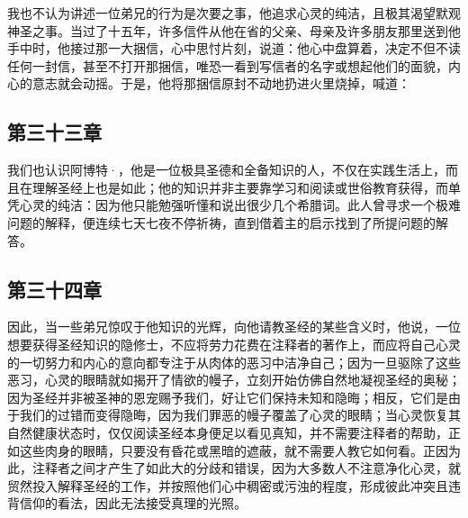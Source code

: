 \par

我也不认为讲述一位弟兄的行为是次要之事，他追求心灵的纯洁，且极其渴望默观神圣之事。当过了十五年，许多信件从他在省的父亲、母亲及许多朋友那里送到他手中时，他接过那一大捆信，心中思忖片刻，说道：他心中盘算着，决定不但不读任何一封信，甚至不打开那捆信，唯恐一看到写信者的名字或想起他们的面貌，内心的意志就会动摇。于是，他将那捆信原封不动地扔进火里烧掉，喊道：\par


\subsection{第三十三章}

\par

我们也认识阿博特·，他是一位极具圣德和全备知识的人，不仅在实践生活上，而且在理解圣经上也是如此；他的知识并非主要靠学习和阅读或世俗教育获得，而单凭心灵的纯洁：因为他只能勉强听懂和说出很少几个希腊词。此人曾寻求一个极难问题的解释，便连续七天七夜不停祈祷，直到借着主的启示找到了所提问题的解答。\par


\subsection{第三十四章}

\par

因此，当一些弟兄惊叹于他知识的光辉，向他请教圣经的某些含义时，他说，一位想要获得圣经知识的隐修士，不应将劳力花费在注释者的著作上，而应将自己心灵的一切努力和内心的意向都专注于从肉体的恶习中洁净自己；因为一旦驱除了这些恶习，心灵的眼睛就如揭开了情欲的幔子，立刻开始仿佛自然地凝视圣经的奥秘；因为圣经并非被圣神的恩宠赐予我们，好让它们保持未知和隐晦；相反，它们是由于我们的过错而变得隐晦，因为我们罪恶的幔子覆盖了心灵的眼睛；当心灵恢复其自然健康状态时，仅仅阅读圣经本身便足以看见真知，并不需要注释者的帮助，正如这些肉身的眼睛，只要没有昏花或黑暗的遮蔽，就不需要人教它如何看。正因为此，注释者之间才产生了如此大的分歧和错误，因为大多数人不注意净化心灵，就贸然投入解释圣经的工作，并按照他们心中稠密或污浊的程度，形成彼此冲突且违背信仰的看法，因此无法接受真理的光照。\par

